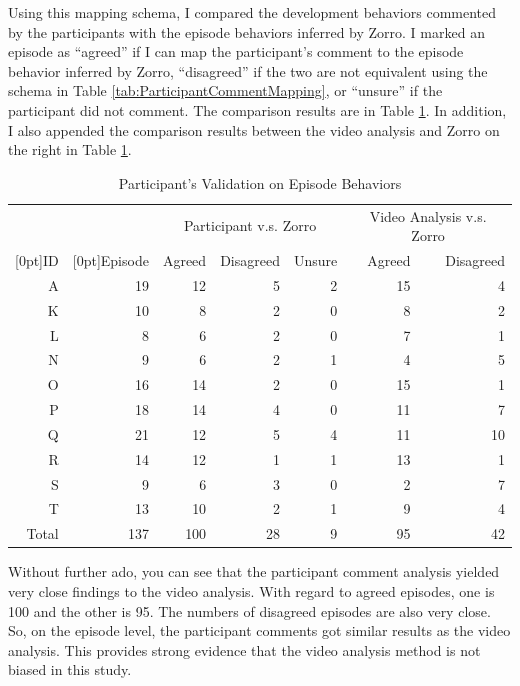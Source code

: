 Using this mapping schema, I compared the development behaviors
commented by the participants with the episode behaviors inferred by
Zorro. I marked an episode as ``agreed'' if I can map the
participant's comment to the episode behavior inferred by Zorro,
``disagreed'' if the two are not equivalent using the schema in Table
\ref{tab:ParticipantCommentMapping}, or ``unsure'' if the participant
did not comment. The comparison results are in Table
\ref{tab:ParticipantBehaviorValidation}.  In addition, I also appended
the comparison results between the video analysis and Zorro on the
right in Table \ref{tab:ParticipantBehaviorValidation}.
\begin{table}[!ht] 
  \centering
\begin{tabular}{|r|r|rrr|rr|} \hline
  &  &  \multicolumn{3}{c|}{Participant v.s. Zorro} & 
        \multicolumn{2}{c|}{Video Analysis v.s. Zorro} \\\cline{3-7}
  \raisebox{1.5ex}[0pt]{ID} & \raisebox{1.5ex}[0pt]{Episode} & 
   Agreed & Disagreed  & Unsure &  Agreed & Disagreed  \\ \hline
  A & 19 & 12 & 5 & 2 & 15 & 4 \\ \hline
  K & 10 &  8 & 2 & 0 &  8 & 2 \\ \hline
  L &  8 &  6 & 2 & 0 &  7 & 1 \\ \hline
  N &  9 &  6 & 2 & 1 &  4 & 5 \\ \hline
  O & 16 & 14 & 2 & 0 & 15 & 1 \\ \hline
  P & 18 & 14 & 4 & 0 & 11 & 7 \\ \hline
  Q & 21 & 12 & 5 & 4 & 11 & 10 \\ \hline
  R & 14 & 12 & 1 & 1 & 13 & 1 \\ \hline
  S &  9 &  6 & 3 & 0 &  2 & 7 \\ \hline
  T & 13 & 10 & 2 & 1 &  9 & 4 \\ \hline
  Total & 137 & 100 & 28 & 9 & 95 & 42 \\ \hline
  \end{tabular}  
  \caption{Participant's Validation on Episode Behaviors}
  \label{tab:ParticipantBehaviorValidation}
\end{table}
Without further ado, you can see that the participant comment analysis 
yielded very close findings to the video analysis. With regard to agreed
episodes, one is 100 and the other is 95. The numbers of disagreed episodes
are also very close. So, on the episode level, the participant comments
got similar results as the video analysis. This provides strong evidence
that the video analysis method is not biased in this study. 

